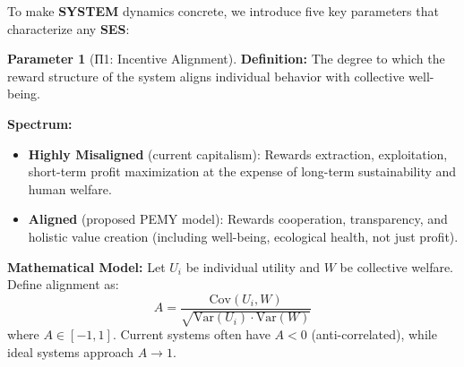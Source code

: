 \documentclass[11pt,a4paper]{article}
\newcommand{\SYSTEM}{\textbf{SYSTEM}}
\newcommand{\SES}{\textbf{SES}}
\theoremstyle{definition}
\newtheorem{parameter}{Parameter}[section]
\theoremstyle{remark}
\begin{document}
To make \SYSTEM{} dynamics concrete, we introduce five key parameters that characterize any \SES{}:

\begin{parameter}[П1: Incentive Alignment]
\label{param:incentive}
\textbf{Definition:} The degree to which the reward structure of the system aligns individual behavior with collective well-being.

\textbf{Spectrum:}
\begin{itemize}
\item \textbf{Highly Misaligned} (current capitalism): Rewards extraction, exploitation, short-term profit maximization at the expense of long-term sustainability and human welfare.
\item \textbf{Aligned} (proposed PEMY model): Rewards cooperation, transparency, and holistic value creation (including well-being, ecological health, not just profit).
\end{itemize}

\textbf{Mathematical Model:}
Let $U_i$ be individual utility and $W$ be collective welfare. Define alignment as:
\[
A = \frac{\text{Cov}(U_i, W)}{\sqrt{\text{Var}(U_i) \cdot \text{Var}(W)}}
\]
where $A \in [-1, 1]$. Current systems often have $A < 0$ (anti-correlated), while ideal systems approach $A \to 1$.
\end{parameter}
\end{document}

